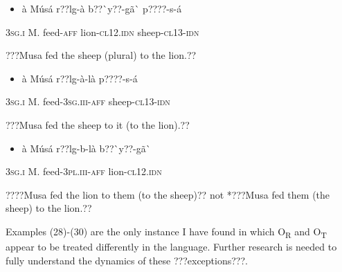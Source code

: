 \documentclass[output=paper]{langsci/langscibook}
\begin{document}
{{\begin{itemize}
\item \begin{styleNumberedEX}
\label{bkm:Ref424335625}\`{a}    M\'{u}s\'{a}  r??lg-\`{a}    b??\`{ }y??-g\~{a}\`{ }    p????-s-\'{a}
\end{styleNumberedEX}\end{itemize}
\begin{styleGloss}
\textsc{3sg.i  }  M.  feed-\textsc{aff}  lion-\textsc{cl12.idn}  sheep-\textsc{cl13-idn}
\end{styleGloss}

\begin{styleTranslation}
???Musa fed the sheep (plural) to the lion.??
\end{styleTranslation}

\begin{itemize}
\item \begin{styleNumberedEX}
\label{bkm:Ref424317641}\`{a}    M\'{u}s\'{a}    r??lg-\`{a}-l\`{a}    p????-s-\'{a}
\end{styleNumberedEX}\end{itemize}
\begin{styleGloss}
\textsc{3sg.i  }  M.    feed-\textsc{3sg.iii-aff}  sheep-\textsc{cl13-idn}
\end{styleGloss}

\begin{styleTranslation}
???Musa fed the sheep to it (to the lion).??
\end{styleTranslation}

\begin{itemize}
\item \begin{styleNumberedEX}
\label{bkm:Ref424317670}\`{a}    M\'{u}s\'{a}  r??lg-b-l\`{a}      b??\`{ }y??-g\~{a}\`{ }
\end{styleNumberedEX}\end{itemize}
\begin{styleGloss}
\textsc{3sg.i  }  M.  feed-\textsc{3pl.iii-aff  }  lion-\textsc{cl12.idn}
\end{styleGloss}

\begin{styleTranslation}
????Musa fed the lion to them (to the sheep)?? not *???Musa fed them (the sheep) to the lion.??  
\end{styleTranslation}

Examples (28){}-(30) are the only instance I have found in which O\textsubscript{R} and O\textsubscript{T} appear to be treated differently in the language. Further research is needed to fully understand the dynamics of these ???exceptions???.

}}
\end{document}
